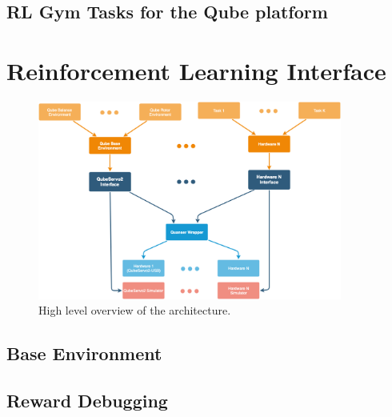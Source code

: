 \subsection{RL Gym Tasks for the Qube platform}
\lipsum[12-13]



\section{Reinforcement Learning Interface}

\begin{figure}
    \centering
    \includegraphics[width=10cm]{figures/high-level-architecture}
    \caption{High level overview of the architecture.}
\end{figure}

\lipsum[15]

\subsection{Base Environment}
\lipsum[19]

\subsection{Reward Debugging}
\lipsum[21]

